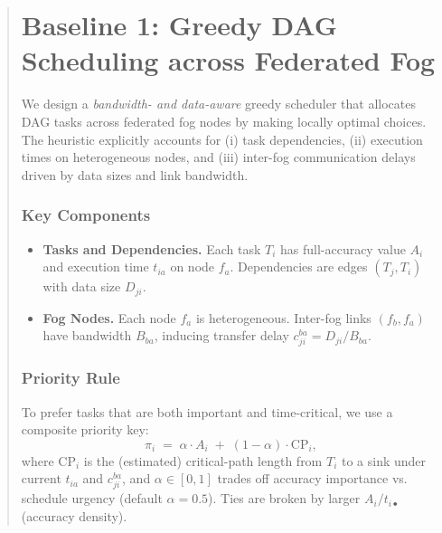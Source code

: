 \documentclass[conference]{IEEEtran}
\begin{document}
\begin{abstract}
\section{Baseline 1: Greedy DAG Scheduling across Federated Fog}
\label{sec:baseline-greedy}
We design a \emph{bandwidth- and data-aware} greedy scheduler that allocates DAG tasks across federated fog nodes by making locally optimal choices. The heuristic explicitly accounts for (i) task dependencies, (ii) execution times on heterogeneous nodes, and (iii) inter-fog communication delays driven by data sizes and link bandwidth.

\subsubsection{Key Components}
\begin{itemize}
    \item \textbf{Tasks and Dependencies.} Each task \(T_i\) has full-accuracy value \(A_i\) and execution time \(t_{ia}\) on node \(f_a\). Dependencies are edges \((T_j,T_i)\) with data size \(D_{ji}\).
    \item \textbf{Fog Nodes.} Each node \(f_a\) is heterogeneous. Inter-fog links \((f_b,f_a)\) have bandwidth \(B_{ba}\), inducing transfer delay \(c_{ji}^{ba}=D_{ji}/B_{ba}\).
\end{itemize}

\subsubsection{Priority Rule}
To prefer tasks that are both important and time-critical, we use a composite priority key:
\[
\pi_i \;=\; \alpha \cdot A_i \;+\; (1-\alpha)\cdot \text{CP}_i,
\]
where \(\text{CP}_i\) is the (estimated) critical-path length from \(T_i\) to a sink under current \(t_{ia}\) and \(c_{ji}^{ba}\), and \(\alpha\in[0,1]\) trades off accuracy importance vs. schedule urgency (default \(\alpha=0.5\)). Ties are broken by larger \(A_i/t_{i\bullet}\) (accuracy density).


\end{abstract}
\end{document}
